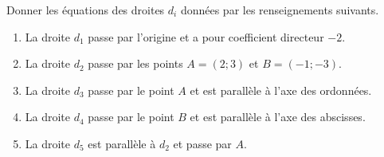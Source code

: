 
\begin{exercice}\label{exosmath-0239}

    Donner les équations des droites \( d_i\) données par les renseignements suivants.
    \begin{enumerate}
        \item
            La droite \( d_1\) passe par l'origine et a pour coefficient directeur \( -2\).
        \item
            La droite \( d_2\) passe par les points \( A=(2;3)\) et \( B=(-1;-3)\).
        \item
            La droite \( d_3\) passe par le point \( A\) et est parallèle à l'axe des ordonnées.
        \item
            La droite \( d_4\) passe par le point \( B\) et est parallèle à l'axe des abscisses.
        \item
            La droite \( d_5\) est parallèle à \( d_2\) et passe par \( A\).
    \end{enumerate}


\end{exercice}
